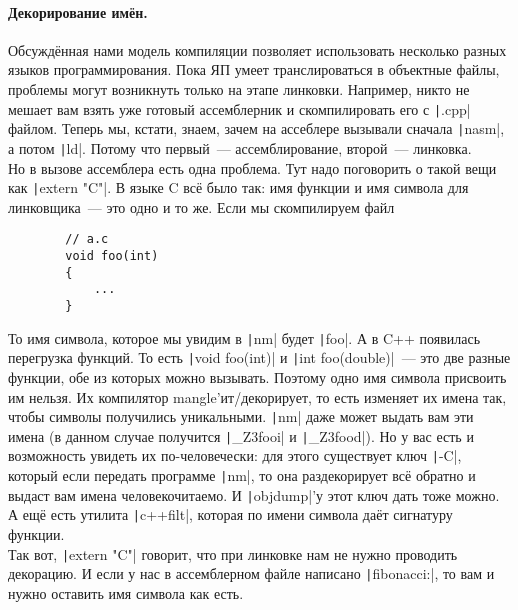 \documentclass{article}
\begin{document}
    \paragraph{Декорирование имён.}
    Обсуждённая нами модель компиляции позволяет использовать несколько разных языков программирования. Пока ЯП умеет транслироваться в объектные файлы, проблемы могут возникнуть только на этапе линковки. Например, никто не мешает вам взять уже готовый ассемблерник и скомпилировать его с \texttt|.cpp| файлом. Теперь мы, кстати, знаем, зачем на ассеблере вызывали сначала \texttt|nasm|, а потом \texttt|ld|. Потому что первый~--- ассемблирование, второй~--- линковка.\\
    Но в вызове ассемблера есть одна проблема. Тут надо поговорить о такой вещи как \texttt|extern "C"|. В языке C всё было так: имя функции и имя символа для линковщика~--- это одно и то же. Если мы скомпилируем файл
    \begin{verbatim}
        // a.c
        void foo(int)
        {
            ...
        }
    \end{verbatim}
    То имя символа, которое мы увидим в \texttt|nm| будет \texttt|foo|. А в C++ появилась перегрузка функций. То есть \texttt|void foo(int)| и \texttt|int foo(double)|~--- это две разные функции, обе из которых можно вызывать. Поэтому одно имя символа присвоить им нельзя. Их компилятор mangle'ит/декорирует, то есть изменяет их имена так, чтобы символы получились уникальными. \texttt|nm| даже может выдать вам эти имена (в данном случае получится \texttt|_Z3fooi| и \texttt|_Z3food|). Но у вас есть и возможность увидеть их по-человечески: для этого существует ключ \texttt|-C|, который если передать программе \texttt|nm|, то она раздекорирует всё обратно и выдаст вам имена человекочитаемо. И \texttt|objdump|'у этот ключ дать тоже можно. А ещё есть утилита \texttt|c++filt|, которая по имени символа даёт сигнатуру функции.\\
    Так вот, \texttt|extern "C"| говорит, что при линковке нам не нужно проводить декорацию. И если у нас в ассемблерном файле написано \texttt|fibonacci:|, то вам и нужно оставить имя символа как есть.
\end{document}
